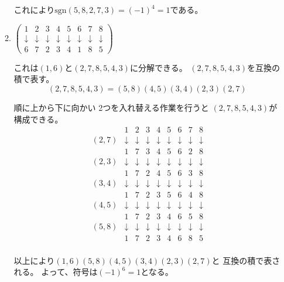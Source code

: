 \documentclass[12pt,b5paper]{ltjsarticle}
\begin{document}
\begin{enumerate}
\begin{enumerate}
            これにより$\mathrm{sgn}(5,8,2,7,3)=(-1)^4=1$である。

       \item
            $
            \begin{pmatrix}
             1 & 2 & 3 & 4 & 5 & 6 & 7 & 8\\
             \downarrow & \downarrow & \downarrow & \downarrow & \downarrow & \downarrow & \downarrow & \downarrow \\
             6 & 7 & 2 & 3 & 4 & 1 & 8 & 5
            \end{pmatrix}
            $

            これは$(1,6)$と$(2,7,8,5,4,3)$に分解できる。
            $(2,7,8,5,4,3)$を互換の積で表す。
            \begin{equation}
             (2,7,8,5,4,3) = (5,8)(4,5)(3,4)(2,3)(2,7)
            \end{equation}

            順に上から下に向かい
            2つを入れ替える作業を行うと
            $(2,7,8,5,4,3)$が構成できる。
            \begin{equation}
             \begin{matrix}
              & 1 & 2 & 3 & 4 & 5 & 6 & 7 & 8\\
              (2,7) & \downarrow & \downarrow & \downarrow & \downarrow & \downarrow & \downarrow & \downarrow & \downarrow \\
              & 1 & 7 & 3 & 4 & 5 & 6 & 2 & 8\\
              (2,3) & \downarrow & \downarrow & \downarrow & \downarrow & \downarrow & \downarrow & \downarrow & \downarrow \\
              & 1 & 7 & 2 & 4 & 5 & 6 & 3 & 8\\
              (3,4) & \downarrow & \downarrow & \downarrow & \downarrow & \downarrow & \downarrow & \downarrow & \downarrow \\
              & 1 & 7 & 2 & 3 & 5 & 6 & 4 & 8\\
              (4,5) & \downarrow & \downarrow & \downarrow & \downarrow & \downarrow & \downarrow & \downarrow & \downarrow \\
              & 1 & 7 & 2 & 3 & 4 & 6 & 5 & 8\\
              (5,8) & \downarrow & \downarrow & \downarrow & \downarrow & \downarrow & \downarrow & \downarrow & \downarrow \\
              & 1 & 7 & 2 & 3 & 4 & 6 & 8 & 5\\
             \end{matrix}
            \end{equation}

            以上により$(1,6)(5,8)(4,5)(3,4)(2,3)(2,7)$と
            互換の積で表される。
            よって、符号は$(-1)^6=1$となる。
      \end{enumerate}
\end{enumerate}






\hrulefill
\end{document}
